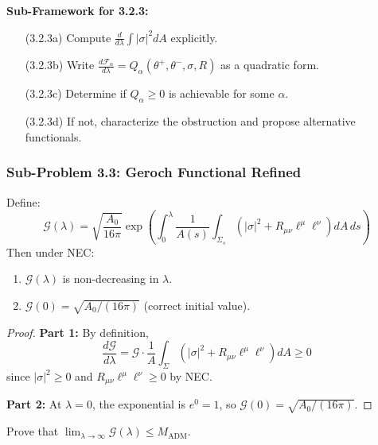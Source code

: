 \textbf{Sub-Framework for 3.2.3:}
\begin{enumerate}
    \item[(3.2.3a)] Compute $\frac{d}{d\lambda}\int|\sigma|^2 dA$ explicitly.
    \item[(3.2.3b)] Write $\frac{d\mathcal{F}_\alpha}{d\lambda} = Q_\alpha(\theta^+, \theta^-, \sigma, R)$ as a quadratic form.
    \item[(3.2.3c)] Determine if $Q_\alpha \geq 0$ is achievable for some $\alpha$.
    \item[(3.2.3d)] If not, characterize the obstruction and propose alternative functionals.
\end{enumerate}

\subsubsection{Sub-Problem 3.3: Geroch Functional Refined}

\begin{theorem}\label{thm:gerochpartial}
Define:
\begin{equation}
    \mathcal{G}(\lambda) = \sqrt{\frac{A_0}{16\pi}} \exp\left(\int_0^\lambda \frac{1}{A(s)}\int_{\Sigma_s}(|\sigma|^2 + R_{\mu\nu}\ell^\mu\ell^\nu) dA \, ds\right)
\end{equation}
Then under NEC:
\begin{enumerate}
    \item $\mathcal{G}(\lambda)$ is non-decreasing in $\lambda$.
    \item $\mathcal{G}(0) = \sqrt{A_0/(16\pi)}$ (correct initial value).
\end{enumerate}
\end{theorem}

\begin{proof}
\textbf{Part 1:} By definition,
\begin{equation}
    \frac{d\mathcal{G}}{d\lambda} = \mathcal{G} \cdot \frac{1}{A}\int_\Sigma(|\sigma|^2 + R_{\mu\nu}\ell^\mu\ell^\nu) dA \geq 0
\end{equation}
since $|\sigma|^2 \geq 0$ and $R_{\mu\nu}\ell^\mu\ell^\nu \geq 0$ by NEC.

\textbf{Part 2:} At $\lambda = 0$, the exponential is $e^0 = 1$, so $\mathcal{G}(0) = \sqrt{A_0/(16\pi)}$.
\end{proof}

\begin{openproblem}\label{open:gerochconv}
Prove that $\lim_{\lambda \to \infty} \mathcal{G}(\lambda) \leq M_{\mathrm{ADM}}$.
\end{openproblem}

